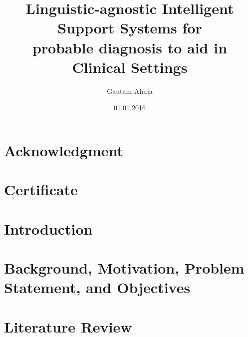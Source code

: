 \documentclass[%
]{tumDiss}
\title{%
  Linguistic-agnostic Intelligent Support Systems for\\
  probable diagnosis to aid in Clinical Settings\\
}
\author{Gautam Ahuja}
\date{01.01.2016}
\begin{document}
\frontmatter
\maketitle


\chapter{Acknowledgment}




\chapter{Certificate}


% 


\tableofcontents
\listoffigures
\listoftables
\printglossary[type=\acronymtype, nonumberlist]

\mainmatter
\chapter{Introduction}
\label{chap:introduction}



\chapter{Background, Motivation, Problem Statement, and Objectives}
\label{chap:bcgmot}



\chapter{Literature Review}
\label{chap:sota}

\end{document}
